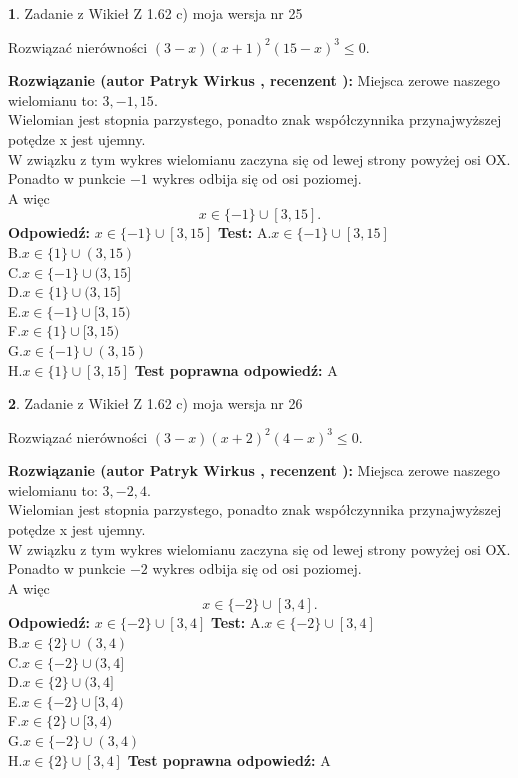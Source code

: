 \documentclass[12pt, a4paper]{article}
\theoremstyle{definition} %
\newtheorem{zad}{}
\newcommand{\zadStart}[1]{\begin{zad}#1\newline}
\newcommand{\zadStop}{\end{zad}}
\newcommand{\rozwStart}[2]{\noindent \textbf{Rozwiązanie (autor #1 , recenzent #2): }\newline}
\newcommand{\rozwStop}{\newline}
\newcommand{\odpStart}{\noindent \textbf{Odpowiedź:}\newline}
\newcommand{\odpStop}{\newline}
\newcommand{\testStart}{\noindent \textbf{Test:}\newline}
\newcommand{\testStop}{\newline}
\newcommand{\kluczStart}{\noindent \textbf{Test poprawna odpowiedź:}\newline}
\newcommand{\kluczStop}{\newline}
\begin{document}
\zadStart{Zadanie z Wikieł Z 1.62 c) moja wersja nr 25}

Rozwiązać nierówności $(3-x)(x+1)^{2}(15-x)^{3}\le0$.
\zadStop
\rozwStart{Patryk Wirkus}{}
Miejsca zerowe naszego wielomianu to: $3, -1, 15$.\\
Wielomian jest stopnia parzystego, ponadto znak współczynnika przy\linebreak najwyższej potędze x jest ujemny.\\ W związku z tym wykres wielomianu zaczyna się od lewej strony powyżej osi OX.\\
Ponadto w punkcie $-1$ wykres odbija się od osi poziomej.\\
A więc $$x \in \{-1\} \cup [3,15].$$
\rozwStop
\odpStart
$x \in \{-1\} \cup [3,15]$
\odpStop
\testStart
A.$x \in \{-1\} \cup [3,15]$\\
B.$x \in \{1\} \cup (3,15)$\\
C.$x \in \{-1\} \cup (3,15]$\\
D.$x \in \{1\} \cup (3,15]$\\
E.$x \in \{-1\} \cup [3,15)$\\
F.$x \in \{1\} \cup [3,15)$\\
G.$x \in \{-1\} \cup (3,15)$\\
H.$x \in \{1\} \cup [3,15]$
\testStop
\kluczStart
A
\kluczStop



\zadStart{Zadanie z Wikieł Z 1.62 c) moja wersja nr 26}

Rozwiązać nierówności $(3-x)(x+2)^{2}(4-x)^{3}\le0$.
\zadStop
\rozwStart{Patryk Wirkus}{}
Miejsca zerowe naszego wielomianu to: $3, -2, 4$.\\
Wielomian jest stopnia parzystego, ponadto znak współczynnika przy\linebreak najwyższej potędze x jest ujemny.\\ W związku z tym wykres wielomianu zaczyna się od lewej strony powyżej osi OX.\\
Ponadto w punkcie $-2$ wykres odbija się od osi poziomej.\\
A więc $$x \in \{-2\} \cup [3,4].$$
\rozwStop
\odpStart
$x \in \{-2\} \cup [3,4]$
\odpStop
\testStart
A.$x \in \{-2\} \cup [3,4]$\\
B.$x \in \{2\} \cup (3,4)$\\
C.$x \in \{-2\} \cup (3,4]$\\
D.$x \in \{2\} \cup (3,4]$\\
E.$x \in \{-2\} \cup [3,4)$\\
F.$x \in \{2\} \cup [3,4)$\\
G.$x \in \{-2\} \cup (3,4)$\\
H.$x \in \{2\} \cup [3,4]$
\testStop
\kluczStart
A
\kluczStop
\end{document}
